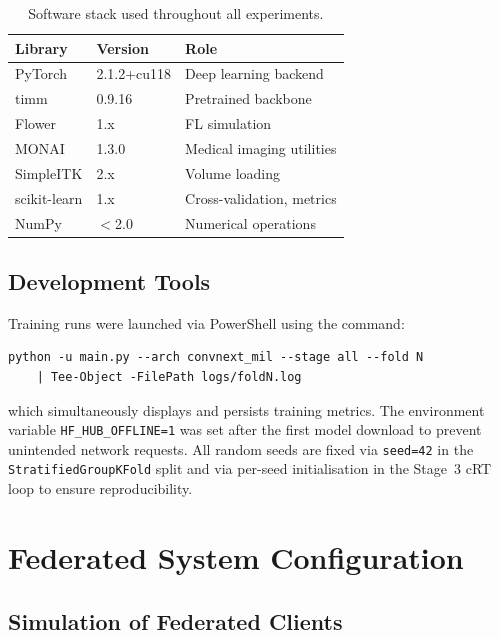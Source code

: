 \begin{table}[htbp]
  \centering
  \caption{Software stack used throughout all experiments.}
  \label{tab:software}
  \renewcommand{\arraystretch}{1.3}
  \begin{tabular}{lll}
    \toprule
    \textbf{Library} & \textbf{Version} & \textbf{Role} \\
    \midrule
    PyTorch     & 2.1.2+cu118 & Deep learning backend \\
    timm        & 0.9.16      & Pretrained backbone \\
    Flower      & 1.x         & FL simulation \\
    MONAI       & 1.3.0       & Medical imaging utilities \\
    SimpleITK   & 2.x         & Volume loading \\
    scikit-learn & 1.x        & Cross-validation, metrics \\
    NumPy       & $<$2.0      & Numerical operations \\
    \bottomrule
  \end{tabular}
\end{table}

\subsection{Development Tools}
\label{sec:dev-tools}

Training runs were launched via PowerShell using the command:
\begin{verbatim}
python -u main.py --arch convnext_mil --stage all --fold N
    | Tee-Object -FilePath logs/foldN.log
\end{verbatim}
which simultaneously displays and persists training metrics.
The environment variable \texttt{HF\_HUB\_OFFLINE=1} was set
after the first model download to prevent unintended network
requests.
All random seeds are fixed via \texttt{seed=42} in the
\texttt{StratifiedGroupKFold} split and via per-seed
initialisation in the Stage~3 cRT loop to ensure
reproducibility.


\section{Federated System Configuration}
\label{sec:fed-system-setup}

\subsection{Simulation of Federated Clients}
\label{sec:client-simulation}

